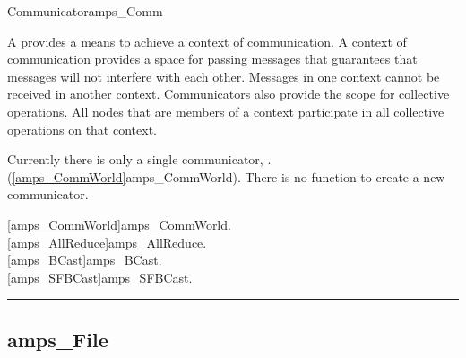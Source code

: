 \begin{deftp}{Communicator}{amps\_Comm}

\DESCRIPTION

A  provides a means to achieve a context of
communication.  A context of communication provides a space for passing
messages that guarantees that messages will not interfere with each other.
  Messages in one context cannot be received in another context.
Communicators also provide the scope for collective operations.  All
nodes that are members of a context participate in all collective
operations on that context.

\NOTES

Currently there is only a single communicator, .
(\vref{amps_CommWorld}{amps\_CommWorld}).  There is no function to create a new
communicator.  

\SEEALSO
\vref{amps_CommWorld}{amps\_CommWorld}. \\
\vref{amps_AllReduce}{amps\_AllReduce}. \\
\vref{amps_BCast}{amps\_BCast}. \\
\vref{amps_SFBCast}{amps\_SFBCast}. \\

\end{deftp}


\noindent\rule{\textwidth}{1mm}

\subsection{amps\_File}
\label{amps_File}


